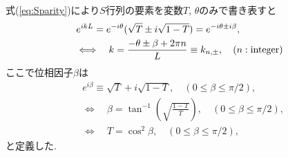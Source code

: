 \documentclass[10pt,a4j]{jarticle}
\begin{document}
式(\ref{eq:Sparity})により$S$行列の要素を変数$T$, $\theta$のみで書き表すと
\begin{align}
& e^{ikL} = e^{-i \theta} (\sqrt{T} \pm i \sqrt{1-T} ) = e^{-i \theta \pm i \beta}, \nonumber \\
& \Longleftrightarrow \quad k = \frac{-\theta \pm \beta + 2\pi n}{L} \equiv k_{n,\pm}, \quad (n: {\rm integer})
\end{align}
ここで位相因子$\beta$は
\begin{align}
& e^{i  \beta} \equiv \sqrt{T} + i \sqrt{1-T}, \quad (0 \le \beta \le \pi/2 ) , \nonumber \\
& \Longleftrightarrow \quad \beta = \tan^{-1} \left( \sqrt{\frac{1-T}{T}} \right) ,  \quad (0 \le \beta \le \pi/2 ), \nonumber \\
& \Longleftrightarrow \quad T = \cos^2 \beta,  \quad (0 \le \beta \le \pi/2 )  , 
\end{align}
と定義した. 

\end{document}

